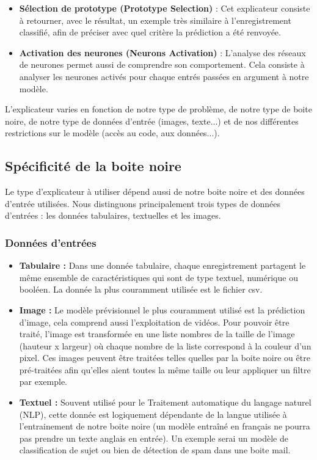 \begin{itemize}
    \item \textbf{Sélection de prototype (Prototype Selection)} : Cet explicateur consiste à retourner, avec le résultat, un exemple très similaire à l'enregistrement classifié, afin de préciser avec quel critère la prédiction a été renvoyée.
    
    \item \textbf{Activation des neurones (Neurons Activation)} : L'analyse des réseaux de neurones permet aussi de comprendre son comportement. Cela consiste à analyser les neurones activés pour chaque entrés passées en argument à notre modèle.
\end{itemize}

L'explicateur varies en fonction de notre type de problème, de notre type de boite noire, de notre type de données d'entrée (images, texte...) et de nos différentes restrictions sur le modèle (accès au code, aux données...).

\subsection{Spécificité de la boite noire}
Le type d'explicateur à utiliser dépend aussi de notre boite noire et des données d'entrée utilisées. Nous distinguons principalement trois types de données d'entrées : les données tabulaires, textuelles et les images.\par

\subsubsection{Données d'entrées}
\begin{itemize}
    \item \textbf{Tabulaire :} Dans une donnée tabulaire, chaque enregistrement partagent le même ensemble de caractéristiques qui sont de type textuel, numérique ou booléen. La donnée la plus couramment utilisée est le fichier csv.
    
    \item \textbf{Image :} Le modèle prévisionnel le plus couramment utilisé est la prédiction d'image, cela comprend aussi l'exploitation de vidéos. Pour pouvoir être traité, l'image est transformée en une liste nombres de la taille de l'image (hauteur x largeur) où chaque nombre de la liste correspond à la couleur d'un pixel. Ces images peuvent être traitées telles quelles par la boite noire ou être pré-traitées afin qu'elles aient toutes la même taille ou leur appliquer un filtre par exemple.
    
    \item \textbf{Textuel :} Souvent utilisé pour le Traitement automatique du langage naturel (NLP), cette donnée est logiquement dépendante de la langue utilisée à l'entrainement de notre boite noire (un modèle entraîné en français ne pourra pas prendre un texte anglais en entrée). Un exemple serai un modèle de classification de sujet ou bien de détection de spam dans une boite mail.
\end{itemize}

